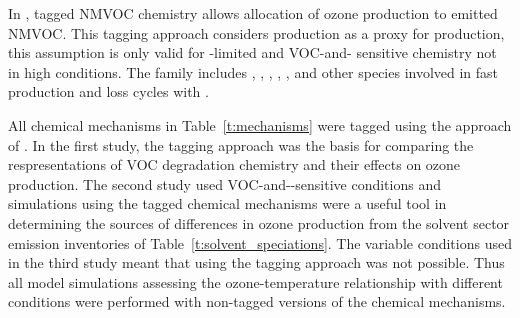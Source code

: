 In \citet{Butler:2011}, tagged NMVOC chemistry allows allocation of ozone production to emitted NMVOC.
This tagging approach considers  production as a proxy for  production, this assumption is only valid for -limited and VOC-and- sensitive chemistry not in high  conditions.
The  family includes , , , , ,  and other species involved in fast production and loss cycles with .

All chemical mechanisms in Table~\ref{t:mechanisms} were tagged using the approach of \citet{Butler:2011}.
In the first study, the tagging approach was the basis for comparing the respresentations of VOC degradation chemistry and their effects on ozone production.
The second study used VOC-and--sensitive conditions and simulations using the tagged chemical mechanisms were a useful tool in determining the sources of differences in ozone production from the solvent sector emission inventories of Table~\ref{t:solvent_speciations}.
The variable  conditions used in the third study meant that using the tagging approach was not possible.
Thus all model simulations assessing the ozone-temperature relationship with different  conditions were performed with non-tagged versions of the chemical mechanisms.
